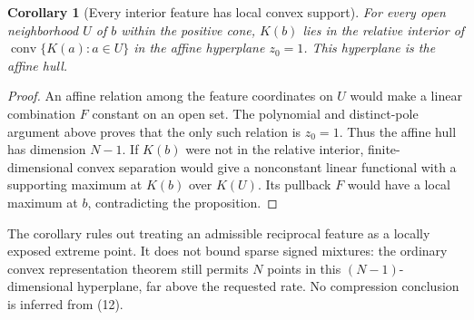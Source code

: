 \documentclass[11pt]{article}
\newtheorem{corollary}[theorem]{Corollary}
\begin{document}
\begin{corollary}[Every interior feature has local convex support]
For every open neighborhood $U$ of $b$ within the positive cone,
$K(b)$ lies in the relative interior of
$\operatorname{conv}\{K(a):a\in U\}$ in the affine hyperplane
$z_0=1$. This hyperplane is the affine hull.
\end{corollary}
\begin{proof}
An affine relation among the feature coordinates on $U$ would
make a linear combination $F$ constant on an open set. The
polynomial and distinct-pole argument above proves that the only
such relation is $z_0=1$. Thus the affine hull has dimension $N-1$.
If $K(b)$ were not in the relative interior, finite-dimensional
convex separation would give a nonconstant linear functional with
a supporting maximum at $K(b)$ over $K(U)$. Its pullback $F$
would have a local maximum at $b$, contradicting the proposition.
\end{proof}

The corollary rules out treating an admissible reciprocal feature as
a locally exposed extreme point. It does not bound sparse signed
mixtures: the ordinary convex representation theorem still permits
$N$ points in this $(N-1)$-dimensional hyperplane, far above the
requested rate. No compression conclusion is inferred from (12).
\end{document}
